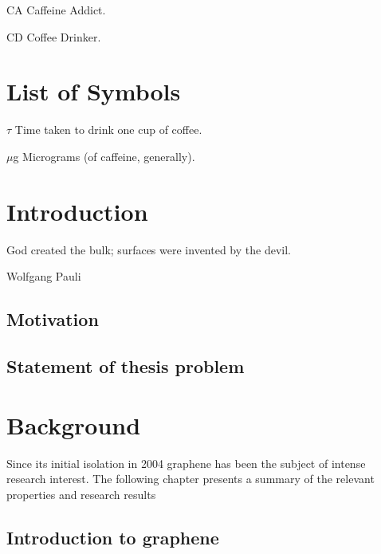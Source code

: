 \documentclass[edeposit,fullpage,draftthesis]{uiucthesis2009}
\begin{document}
\begin{symbollist*}
\item[CA] Caffeine Addict.
\item[CD] Coffee Drinker.
\end{symbollist*}

\chapter{List of Symbols}

\begin{symbollist}[0.7in]
\item[$\tau$] Time taken to drink one cup of coffee.
\item[$\mu$g] Micrograms (of caffeine, generally).
\end{symbollist}

\mainmatter
\chapter{Introduction}

   \epigraph{God created the bulk; surfaces were invented by the devil.}{Wolfgang Pauli}
    

    \section{Motivation}
    \section{Statement of thesis problem}


\chapter{Background}

    Since its initial isolation in 2004 graphene has been the subject of intense research interest. 
    The following chapter presents a summary of the relevant properties and research results 

    \section{Introduction to graphene}
\end{document}
